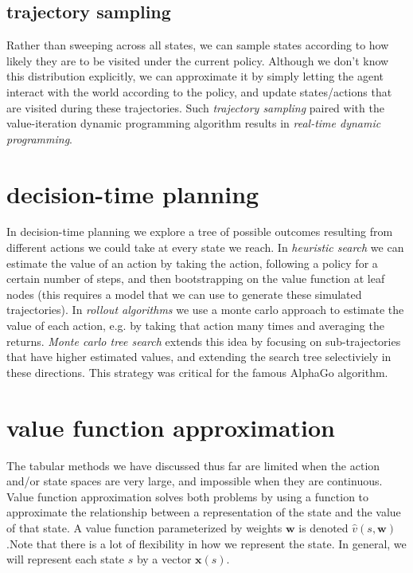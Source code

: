 \subsection{trajectory sampling}
Rather than sweeping across all states, we can sample states according to how likely they are to be visited under the current policy. Although we don't know this distribution explicitly, we can approximate it by simply letting the agent interact with the world according to the policy, and update states/actions that are visited during these trajectories. Such \textit{trajectory sampling} paired with the value-iteration dynamic programming algorithm results in \textit{real-time dynamic programming}.

\section{decision-time planning}
In decision-time planning we explore a tree of possible outcomes resulting from different actions we could take at every state we reach. In \textit{heuristic search} we can estimate the value of an action by taking the action, following a policy for a certain number of steps, and then bootstrapping on the value function at leaf nodes (this requires a model that we can use to generate these simulated trajectories). In \textit{rollout algorithms} we use a monte carlo approach to estimate the value of each action, e.g. by taking that action many times and averaging the returns. \textit{Monte carlo tree search} extends this idea by focusing on sub-trajectories that have higher estimated values, and extending the search tree selectiviely in these directions. This strategy was critical for the famous AlphaGo algorithm.

\section{value function approximation}
The tabular methods we have discussed thus far are limited when the action and/or state spaces are very large, and impossible when they are continuous. Value function approximation solves both problems by using a function to approximate the relationship between a representation of the state and the value of that state. A value function parameterized by weights $\mathbf{w}$ is denoted $\hat{v}(s, \mathbf{w})$.Note that there is a lot of flexibility in how we represent the state. In general, we will represent each state $s$ by a vector $\mathbf{x}(s)$.

